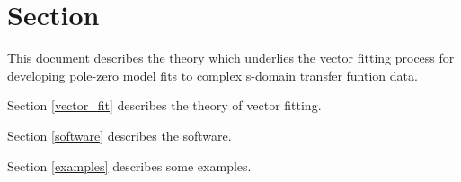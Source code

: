 \section{Section}\label{introduction}


This document describes the theory which underlies the vector fitting process for developing pole-zero model fits to complex s-domain transfer funtion data.

Section \ref{vector_fit} describes the theory of vector fitting.

Section \ref{software} describes the software.

Section \ref{examples} describes some examples.


